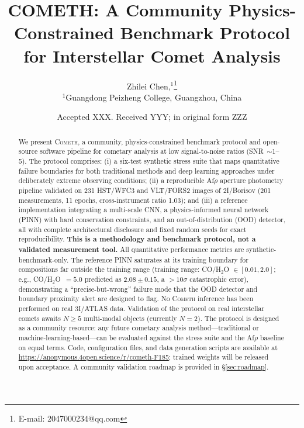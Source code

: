 \documentclass[usenatbib]{mnras}
\begin{document}
\title[COMETH: A Community Benchmark Protocol]{COMETH: A Community Physics-Constrained Benchmark Protocol for Interstellar Comet Analysis}

\author[Chen]{
Zhilei Chen,$^{1}$\thanks{E-mail: 2047000234@qq.com}
\\
$^{1}$Guangdong Peizheng College, Guangzhou, China
}

\date{Accepted XXX. Received YYY; in original form ZZZ}

\begin{abstract}
We present \textsc{Cometh}, a community, physics-constrained benchmark protocol and open-source software pipeline for cometary analysis at low signal-to-noise ratios (SNR~$\sim$1--5). The protocol comprises: (i) a six-test synthetic stress suite that maps quantitative failure boundaries for both traditional methods and deep learning approaches under deliberately extreme observing conditions; (ii) a reproducible Af$\rho$ aperture photometry pipeline validated on 231 HST/WFC3 and VLT/FORS2 images of 2I/Borisov (201 measurements, 11 epochs, cross-instrument ratio 1.03); and (iii) a reference implementation integrating a multi-scale CNN, a physics-informed neural network (PINN) with hard conservation constraints, and an out-of-distribution (OOD) detector, all with complete architectural disclosure and fixed random seeds for exact reproducibility. \textbf{This is a methodology and benchmark protocol, not a validated measurement tool.} All quantitative performance metrics are synthetic-benchmark-only. The reference PINN saturates at its training boundary for compositions far outside the training range (training range: CO/H$_2$O $\in [0.01, 2.0]$; e.g., CO/H$_2$O~$=5.0$ predicted as $2.08\pm0.15$, a $>10\sigma$ catastrophic error), demonstrating a ``precise-but-wrong'' failure mode that the OOD detector and boundary proximity alert are designed to flag. No \textsc{Cometh} inference has been performed on real 3I/ATLAS data. Validation of the protocol on real interstellar comets awaits $N \geq 5$ multi-modal objects (currently $N=2$). The protocol is designed as a community resource: any future cometary analysis method---traditional or machine-learning-based---can be evaluated against the stress suite and the Af$\rho$ baseline on equal terms. Code, configuration files, and data generation scripts are available at \url{https://anonymous.4open.science/r/cometh-F185}; trained weights will be released upon acceptance. A community validation roadmap is provided in \S\ref{sec:roadmap}.
\end{abstract}
\end{document}

